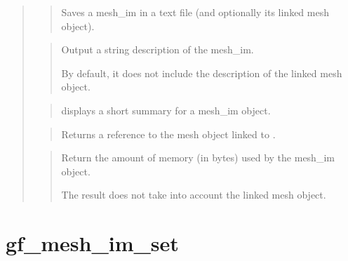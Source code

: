 \documentclass[a4paper,11pt,english]{sphinxmanual}
\begin{document}
\begin{quote}
\begin{quote}
\sphinxAtStartPar
Saves a mesh\_im in a text file (and optionally its linked mesh object).
\end{quote}

\sphinxAtStartPar
{}
\begin{quote}

\sphinxAtStartPar
Output a string description of the mesh\_im.

\sphinxAtStartPar
By default, it does not include the description of the linked
mesh object.
\end{quote}

\sphinxAtStartPar
{}
\begin{quote}

\sphinxAtStartPar
displays a short summary for a mesh\_im object.
\end{quote}

\sphinxAtStartPar
{}
\begin{quote}

\sphinxAtStartPar
Returns a reference to the mesh object linked to .
\end{quote}

\sphinxAtStartPar
{}
\begin{quote}

\sphinxAtStartPar
Return the amount of memory (in bytes) used by the mesh\_im object.

\sphinxAtStartPar
The result does not take into account the linked mesh object.
\end{quote}
\end{quote}


\section{gf\_mesh\_im\_set}
\label{\detokenize{matlab_octave/cmdref_gf_mesh_im_set:gf-mesh-im-set}}\label{\detokenize{matlab_octave/cmdref_gf_mesh_im_set::doc}}
\sphinxAtStartPar
{}

\begin{sphinxVerbatim}[commandchars=\\\{\}]
    \PYG{p}{[}  \PYG{p}{]}
  
\end{sphinxVerbatim}
\end{document}
